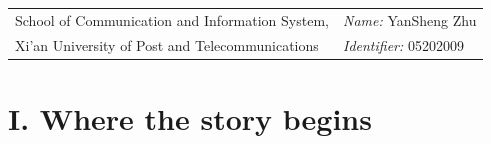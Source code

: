 \documentclass[margin,line]{res}
\begin{document}


\begin{resume}
\vspace{.05in}
\begin{tabular}{@{}p{3.7in}p{4in}}           
	School of Communication and Information System,  & {\it Name:}  YanSheng Zhu \\         
	Xi'an University of Post and Telecommunications & {\it Identifier:}  05202009
\end{tabular}

\section{\sc I. Where the story begins}

\end{resume}
\end{document}
